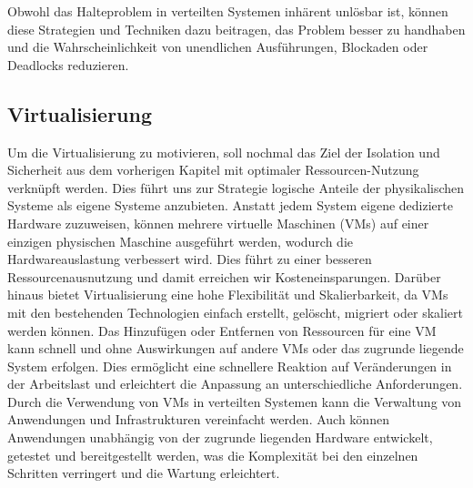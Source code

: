 \documentclass[../vs-script-first-v01.tex]{subfiles}
\begin{document}
Obwohl das Halteproblem in verteilten Systemen inhärent unlösbar ist, können diese Strategien und Techniken dazu beitragen, das Problem besser zu handhaben und die Wahrscheinlichkeit von unendlichen Ausführungen, Blockaden oder Deadlocks reduzieren. 
\subsection{Virtualisierung}
Um die Virtualisierung zu motivieren, soll nochmal das Ziel der Isolation und Sicherheit aus dem vorherigen Kapitel mit optimaler Ressourcen-Nutzung verknüpft werden. Dies führt uns zur Strategie logische Anteile der physikalischen Systeme als eigene Systeme anzubieten. Anstatt jedem System eigene dedizierte Hardware zuzuweisen, können mehrere virtuelle Maschinen (VMs) auf einer einzigen physischen Maschine ausgeführt werden, wodurch die Hardwareauslastung verbessert wird. Dies führt zu einer besseren Ressourcenausnutzung und damit erreichen wir Kosteneinsparungen. Darüber hinaus bietet Virtualisierung eine hohe Flexibilität und Skalierbarkeit, da VMs mit den bestehenden Technologien einfach erstellt, gelöscht, migriert oder skaliert werden können. Das Hinzufügen oder Entfernen von Ressourcen für eine VM kann schnell und ohne Auswirkungen auf andere VMs oder das zugrunde liegende System erfolgen. Dies ermöglicht eine schnellere Reaktion auf Veränderungen in der Arbeitslast und erleichtert die Anpassung an unterschiedliche Anforderungen. Durch die Verwendung von VMs in verteilten Systemen kann die Verwaltung von Anwendungen und Infrastrukturen vereinfacht werden. Auch können Anwendungen unabhängig von der zugrunde liegenden Hardware entwickelt, getestet und bereitgestellt werden, was die Komplexität bei den einzelnen Schritten verringert und die Wartung erleichtert. 
\end{document}
